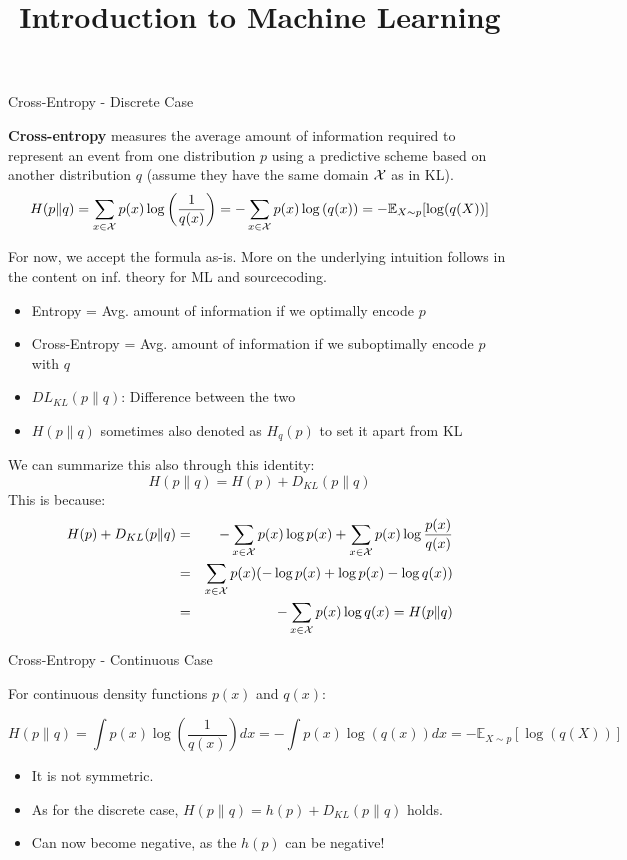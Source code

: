 \documentclass[11pt,compress,t,notes=noshow, xcolor=table]{beamer}
\title{Introduction to Machine Learning}
\date{}
\begin{document}


\begin{vbframe} {Cross-Entropy - Discrete Case}

\textbf{Cross-entropy} measures the average amount of information required to represent an event from one distribution $p$ using a predictive scheme based on another distribution $q$ (assume they have the same domain $\mathcal{X}$ as in KL).
  $$ H(p \| q) = \sum_{x \in \mathcal{X}} p(x) \log\left(\frac{1}{q(x)}\right) = - \sum_{x \in \mathcal{X}} p(x) \log\left(q(x)\right) = - \mathbb{E}_{X\sim p}[\log(q(X))]$$

For now, we accept the formula as-is. More on the underlying intuition follows in the content on inf. theory for ML and sourcecoding.
\begin{itemize}
\setlength{\itemsep}{0.9em}
\item Entropy = Avg. amount of information if we optimally encode $p$
\item Cross-Entropy = Avg. amount of information if we suboptimally encode $p$ with $q$
\item $DL_ {KL}(p \| q)$: Difference between the two
\item $H(p \| q)$ sometimes also denoted as $H_{q}(p)$ to set it apart from KL
\end{itemize}

\framebreak

We can summarize this also through this identity: 
\lz
$$
H(p \| q) = H(p) + D_{KL}(p \| q)
$$
This is because: 
\begin{eqnarray*}
H(p) + D_{KL}(p \| q) &=& - \sum_{x \in \mathcal{X}} p(x) \log p(x) + \sum_{x \in \mathcal{X}} p(x) \log \frac{p(x)}{q(x)} \\
                      &=& \sum_{x \in \mathcal{X}} p(x) (-\log p(x) +  \log p(x) - \log q(x)) \\
&=& - \sum_{x \in \mathcal{X}} p(x) \log q(x) = H(p \| q) \\
\end{eqnarray*}
   
\framebreak
\end{vbframe}

\begin{vbframe} {Cross-Entropy - Continuous Case}

For continuous density functions $p(x)$ and $q(x)$: 

$$ H(p \| q) = \int p(x) \log\left(\frac{1}{q(x)}\right) dx = - \int p(x) \log\left(q(x)\right) dx = - \mathbb{E}_{X \sim p}[\log(q(X))]$$

\begin{itemize}
\item It is not symmetric.
\item As for the discrete case, $H(p \| q) = h(p) + D_{KL}(p \| q)$ holds.
\item Can now become negative, as the $h(p)$ can be negative! 
\end{itemize}
\end{vbframe}
\end{document}

